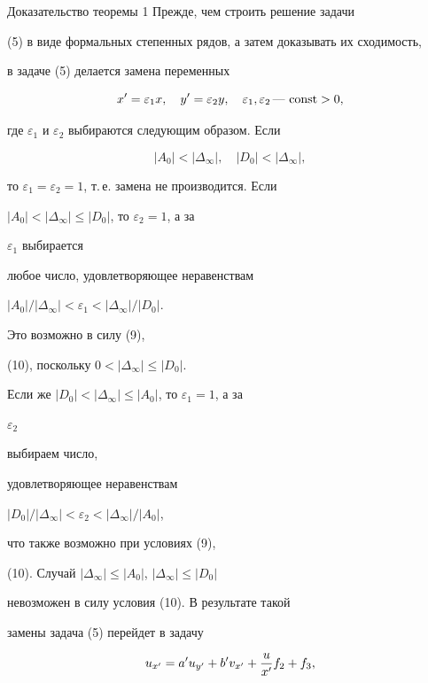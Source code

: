 \begin{pf*}{Доказательство теоремы 1} Прежде, чем строить решение задачи


(5) в виде формальных степенных рядов, а затем доказывать их сходимость,


в задаче (5) делается замена переменных


$$


x'=\varepsilon_1x,\quad y'=\varepsilon_2y,\quad


\varepsilon_1,\varepsilon_2\text{\,---\,}\const>0,


$$


где $\varepsilon_1$ и $\varepsilon_2$ выбираются следующим образом. Если


\begin{equation}


|A_0|<|\Delta_\infty|,\quad |D_0|<|\Delta_\infty|,


\end{equation}


то $\varepsilon_1=\varepsilon_2=1$, т.\,е. замена не производится. Если


$|A_0|<|\Delta_\infty|\le|D_0|$, то $\varepsilon_2=1$, а за


$\varepsilon_1$ выбирается


любое число, удовлетворяющее неравенствам


$|A_0|/|\Delta_\infty|<\varepsilon_1<|\Delta_\infty|/|D_0|$.


Это возможно в силу (9),


(10), поскольку $0<|\Delta_\infty|\le|D_0|$.


Если же $|D_0|<|\Delta_\infty|\le|A_0|$, то $\varepsilon_1=1$, а за


$\varepsilon_2$


выбираем число,


удовлетворяющее неравенствам


$|D_0|/|\Delta_\infty|<\varepsilon_2<|\Delta_\infty|/|A_0|$,


что также возможно при условиях (9),


(10). Случай $|\Delta_\infty|\le|A_0|$, $|\Delta_\infty|\le|D_0|$


невозможен в силу условия (10). В результате такой


замены задача (5) перейдет в задачу


\begin{gather}


u_{x'}=a'u_{y'}+b'v_{x'}+\frac{u}{x'}f_2+f_3,\notag\\



\end{gather}
\end{pf*}
